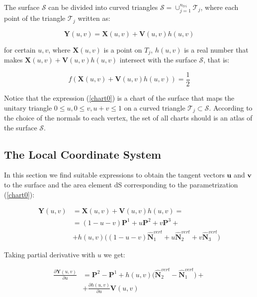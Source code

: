 \documentclass[11pt]{article}
\newcommand\bP{\boldsymbol P}
\newcommand\bN{\boldsymbol N}
\newcommand\bX{\boldsymbol X}
\newcommand\bY{\boldsymbol Y}
\newcommand\bV{\boldsymbol V}
\newcommand\bu{\boldsymbol u}
\newcommand\bv{\boldsymbol v}
\begin{document}
The surface $\mathcal{S}$ can be divided into curved triangles $\mathcal{S}=\cup_{j=1}^{n_{tri}}\mathcal{T}_j$, where each point of the triangle $\mathcal{T}_j$ written as:

\begin{equation}\label{chart0}
\bY(u,v)=\bX(u,v)+\bV(u,v)h(u,v)
\end{equation}

for certain $u,v$, where $\bX(u,v)$ is a point on $\mathit{T}_j$, $h(u,v)$ is a real number that makes $\bX(u,v)+\bV(u,v)h(u,v)$ intersect with the surface $\mathcal{S}$, that is:

\begin{equation}\label{newtoneq}
f(\bX(u,v)+\bV(u,v)h(u,v))=\frac{1}{2}
\end{equation}
 
Notice that the expression (\ref{chart0}) is a chart of the surface
that maps the unitary triangle $0\le u, 0\le v, u+v\le1$ on a curved
triangle $\mathcal{T}_j\subset \mathcal{S}$. According to the choice
of the normals to each vertex, the set of all charts should is an
atlas of the surface $\mathcal{S}$.





\subsection{The Local Coordinate System}

In this section we find suitable expressions to obtain the tangent
vectors $\bu$ and $\bv$ to the surface and the area element dS
corresponding to the parametrization (\ref{chart0}):

\begin{equation}\label{chart}
\begin{aligned}
\bY(u,v)&=\bX(u,v)+\bV(u,v)h(u,v)=\\
&=(1-u-v)\bP^1+u\bP^2+v\bP^3+\\
&+h(u,v)\Big((1-u-v)\hat{\bN}^{vert}_1+u\hat{\bN}^{vert}_2+v\hat{\bN}^{vert}_3\Big)
\end{aligned}
\end{equation}

Taking partial derivative with $u$ we get:

\begin{equation}\label{U_vector}
\begin{aligned}
\frac{\partial\bY(u,v)}{\partial u}&=\bP^2-\bP^1+h(u,v)\Big(\hat{\bN}^{vert}_2-\hat{\bN}^{vert}_1\Big)+\\
&+\frac{\partial h(u,v)}{\partial u}\bV(u,v)
\end{aligned}
\end{equation}
\end{document}
